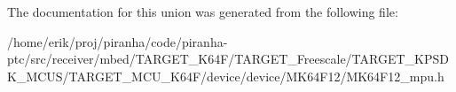 The documentation for this union was generated from the following file\+:\begin{DoxyCompactItemize}
\item 
/home/erik/proj/piranha/code/piranha-\/ptc/src/receiver/mbed/\+T\+A\+R\+G\+E\+T\+\_\+\+K64\+F/\+T\+A\+R\+G\+E\+T\+\_\+\+Freescale/\+T\+A\+R\+G\+E\+T\+\_\+\+K\+P\+S\+D\+K\+\_\+\+M\+C\+U\+S/\+T\+A\+R\+G\+E\+T\+\_\+\+M\+C\+U\+\_\+\+K64\+F/device/device/\+M\+K64\+F12/M\+K64\+F12\+\_\+mpu.\+h\end{DoxyCompactItemize}
